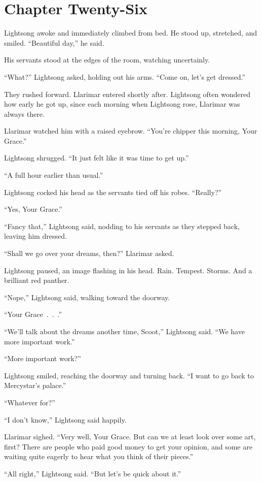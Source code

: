 \section{Chapter Twenty-Six}

Lightsong awoke and immediately climbed from bed. He stood up, stretched, and smiled. “Beautiful day,” he said.

His servants stood at the edges of the room, watching uncertainly.

“What?” Lightsong asked, holding out his arms. “Come on, let’s get dressed.”

They rushed forward. Llarimar entered shortly after. Lightsong often wondered how early he got up, since each morning when Lightsong rose, Llarimar was always there.

Llarimar watched him with a raised eyebrow. “You’re chipper this morning, Your Grace.”

Lightsong shrugged. “It just felt like it was time to get up.”

“A full hour earlier than usual.”

Lightsong cocked his head as the servants tied off his robes. “Really?”

“Yes, Your Grace.”

“Fancy that,” Lightsong said, nodding to his servants as they stepped back, leaving him dressed.

“Shall we go over your dreams, then?” Llarimar asked.

Lightsong paused, an image flashing in his head. Rain. Tempest. Storms. And a brilliant red panther.

“Nope,” Lightsong said, walking toward the doorway.

“Your Grace~.~.~.”

“We’ll talk about the dreams another time, Scoot,” Lightsong said. “We have more important work.”

“More important work?”

Lightsong smiled, reaching the doorway and turning back. “I want to go back to Mercystar’s palace.”

“Whatever for?”

“I don’t know,” Lightsong said happily.

Llarimar sighed. “Very well, Your Grace. But can we at least look over some art, first? There are people who paid good money to get your opinion, and some are waiting quite eagerly to hear what you think of their pieces.”

“All right,” Lightsong said. “But let’s be quick about it.”

